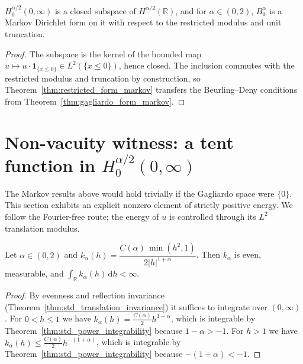\begin{theorem}\label{thm:restricted_gagliardo_form_markov}
\leanok
$H^{\alpha/2}_0(0, \infty)$ is a closed subspace of $H^{\alpha/2}(\mathbb{R})$, and for $\alpha \in (0, 2)$, $B^\alpha_0$ is a Markov Dirichlet form on it with respect to the restricted modulus and unit truncation.
\end{theorem}

\begin{proof}
\leanok
The subspace is the kernel of the bounded map $u \mapsto u \cdot \mathbf{1}_{\{x \le 0\}} \in L^2(\{x \le 0\})$, hence closed. The inclusion commutes with the restricted modulus and truncation by construction, so Theorem~\ref{thm:restricted_form_markov} transfers the Beurling--Deny conditions from Theorem~\ref{thm:gagliardo_form_markov}.
\end{proof}

\section{Non-vacuity witness: a tent function in $H^{\alpha/2}_0(0, \infty)$}

The Markov results above would hold trivially if the Gagliardo space were $\{0\}$. This section exhibits an explicit nonzero element of strictly positive energy. We follow the Fourier-free route; the energy of $u$ is controlled through its $L^2$ translation modulus.

\begin{lemma}\label{lem:gagliardo_kernel_integrable}
\leanok
Let $\alpha \in (0, 2)$ and $k_\alpha(h) = \dfrac{C(\alpha)\, \min(h^2, 1)}{2 \lvert h \rvert^{1 + \alpha}}$. Then $k_\alpha$ is even, measurable, and $\int_{\mathbb{R}} k_\alpha(h)\, \mathrm{d}h < \infty$.
\end{lemma}

\begin{proof}
\leanok
By evenness and reflection invariance (Theorem~\ref{thm:std_translation_invariance}) it suffices to integrate over $(0, \infty)$. For $0 < h \le 1$ we have $k_\alpha(h) = \tfrac{C(\alpha)}{2} h^{1 - \alpha}$, which is integrable by Theorem~\ref{thm:std_power_integrability} because $1 - \alpha > -1$. For $h > 1$ we have $k_\alpha(h) \le \tfrac{C(\alpha)}{2} h^{-(1 + \alpha)}$, which is integrable by Theorem~\ref{thm:std_power_integrability} because $-(1 + \alpha) < -1$.
\end{proof}

